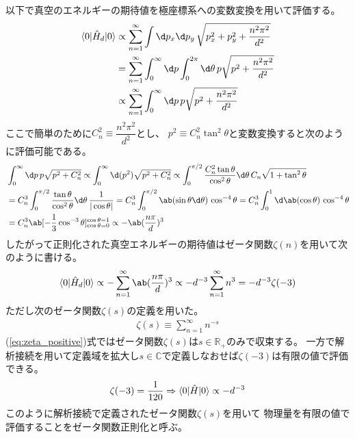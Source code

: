 以下で真空のエネルギーの期待値を極座標系への変数変換を用いて評価する。
\begin{equation}
  \begin{split}
    \braket{0|\hat{H}_d|0}
    &\propto\sum_{n=1}^\infty
    \int\d p_x\d p_y\,\sqrt{p_x^2+p_y^2+\frac{n^2\pi^2}{d^2}} \\
    &=\sum_{n=1}^\infty
    \int_0^\infty\d p\int_0^{2\pi}\d \theta\,p\sqrt{p^2+\frac{n^2\pi^2}{d^2}} \\
    &\propto
    \sum_{n=1}^\infty
    \int_0^\infty\d p\,p\sqrt{p^2+\frac{n^2\pi^2}{d^2}}
  \end{split}
\end{equation}
ここで簡単のために$C_n^2\equiv\dfrac{n^2\pi^2}{d^2}$とし、
$p^2\equiv C_n^2\tan^2\theta$と変数変換すると次のように評価可能である。
\begin{equation}
  \begin{split}
    &\int_0^\infty\d p\,p\sqrt{p^2+C_n^2}
    \propto\int_0^\infty\d (p^2)\sqrt{p^2+C_n^2}
    \propto\int_0^{\pi/2}
    \frac{C_n^2\tan\theta}{\cos^2\theta}
    \d\theta\,
    C_n\sqrt{1+\tan^2\theta} \\
    &=C_n^3\int_0^{\pi/2}
    \frac{\tan\theta}{\cos^2\theta}
    \d\theta\,
    \frac{1}{|\cos\theta|}
    =C_n^3\int_0^{\pi/2}
    \ab(\sin\theta\d\theta)\,
    \cos^{-4}\theta
    =C_n^3\int_0^1
    \d\ab(\cos\theta)\,
    \cos^{-4}\theta \\
    &=C_n^3\ab[-\frac{1}{3}\cos^{-3}\theta]_{\cos\theta=0}^{\cos\theta=1}
    \propto-\ab(\frac{n\pi}{d})^3
  \end{split}
\end{equation}
したがって正則化された真空エネルギーの期待値はゼータ関数$\zeta(n)$を用いて次のように書ける。
\begin{equation}
  \braket{0|\hat{H}_d|0}
  \propto
  -\sum_{n=1}^\infty\ab(\frac{n\pi}{d})^3
  \propto-d^{-3}\sum_{n=1}^\infty n^3
  =-d^{-3}\zeta(-3)
\end{equation}
ただし次のゼータ関数$\zeta(s)$の定義を用いた。
\begin{equation}
  \label{eq:zeta_positive}
  \begin{split}
    \zeta(s)
    \equiv\sum_{n=1}^\infty n^{-s}
  \end{split}
\end{equation}
(\ref{eq:zeta_positive})式ではゼータ関数$\zeta(s)$は$s\in\mathbb{R}_+$のみで収束する。
一方で解析接続を用いて定義域を拡大し$s\in\mathbb{C}$で定義しなおせば$\zeta(-3)$は有限の値で評価できる。
\begin{equation}
  \label{eq:zeta_reg}
  \zeta(-3)=\frac{1}{120}
  \Rightarrow
  \braket{0|\hat{H}|0}\propto -d^{-3}
\end{equation}
このように解析接続で定義されたゼータ関数$\zeta(s)$を用いて
物理量を有限の値で評価することをゼータ関数正則化と呼ぶ。

